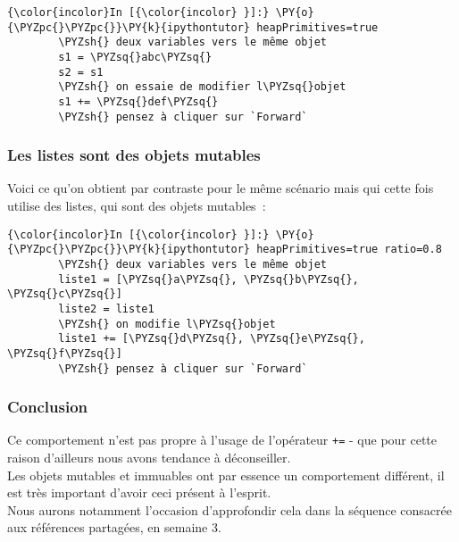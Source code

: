     \begin{Verbatim}[commandchars=\\\{\}]
{\color{incolor}In [{\color{incolor} }]:} \PY{o}{\PYZpc{}\PYZpc{}}\PY{k}{ipythontutor} heapPrimitives=true
        \PYZsh{} deux variables vers le même objet
        s1 = \PYZsq{}abc\PYZsq{}
        s2 = s1
        \PYZsh{} on essaie de modifier l\PYZsq{}objet
        s1 += \PYZsq{}def\PYZsq{}
        \PYZsh{} pensez à cliquer sur `Forward`
\end{Verbatim}


    \hypertarget{les-listes-sont-des-objets-mutables}{%
\subsubsection{Les listes sont des objets
mutables}\label{les-listes-sont-des-objets-mutables}}

    Voici ce qu'on obtient par contraste pour le même scénario mais qui
cette fois utilise des listes, qui sont des objets mutables~:

    \begin{Verbatim}[commandchars=\\\{\}]
{\color{incolor}In [{\color{incolor} }]:} \PY{o}{\PYZpc{}\PYZpc{}}\PY{k}{ipythontutor} heapPrimitives=true ratio=0.8
        \PYZsh{} deux variables vers le même objet
        liste1 = [\PYZsq{}a\PYZsq{}, \PYZsq{}b\PYZsq{}, \PYZsq{}c\PYZsq{}]
        liste2 = liste1
        \PYZsh{} on modifie l\PYZsq{}objet
        liste1 += [\PYZsq{}d\PYZsq{}, \PYZsq{}e\PYZsq{}, \PYZsq{}f\PYZsq{}]
        \PYZsh{} pensez à cliquer sur `Forward`
\end{Verbatim}


    \hypertarget{conclusion}{%
\subsubsection{Conclusion}\label{conclusion}}

    Ce comportement n'est pas propre à l'usage de l'opérateur \texttt{+=} -
que pour cette raison d'ailleurs nous avons tendance à déconseiller.\\


Les objets mutables et immuables ont par essence un comportement
différent, il est très important d'avoir ceci présent à l'esprit.\\

Nous aurons notamment l'occasion d'approfondir cela dans la séquence
consacrée aux références partagées, en semaine 3.